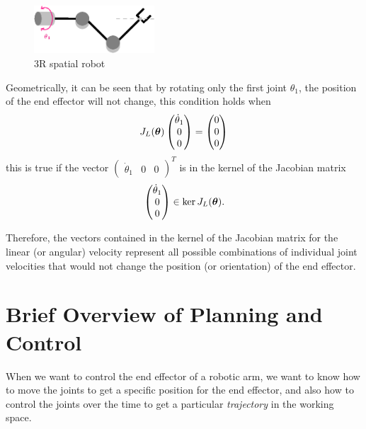 \documentclass[10pt, letterpaper]{report}
\begin{document}
\begin{figure}[h!]
    \centering
    \includegraphics[width=0.4\textwidth ]{images/impossible_velocity_new.eps} 
    \caption{3R spatial robot}
    \label{img:impossible_traj}
\end{figure}

Geometrically, it can be seen that by rotating only the first joint $\theta_1$, the position of the end effector will not change, this condition holds when\begin{equation}
    J_L({\boldsymbol{\theta}})\begin{pmatrix}
        \dot\theta_1\\0\\0
    \end{pmatrix}=\begin{pmatrix}
        0\\0\\0
    \end{pmatrix}
\end{equation}
this is true if the vector $\begin{pmatrix}
        \dot\theta_1&0&0
    \end{pmatrix}^T$ is in the kernel of the Jacobian matrix\begin{equation}
        \begin{pmatrix}
        \dot\theta_1\\0\\0
    \end{pmatrix}\in \ker J_L({\boldsymbol{\theta}}).
    \end{equation}

Therefore, the vectors contained in the kernel of the Jacobian matrix for the linear (or angular) velocity represent all possible combinations of individual joint velocities that would not change the position (or orientation) of the end effector.
\section{Brief Overview of Planning and Control}
When we want to control the end effector of a robotic arm, we want to know how to move the joints to get a specific position for the end effector, and also how to control the joints over the time to get a particular \textit{trajectory} in the working space. 
\end{document}
